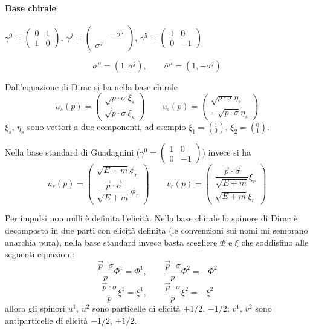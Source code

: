 \documentclass[12pt,a4paper]{article}
\begin{document}
	\paragraph{Base chirale}
	
	$\gamma^0 = \begin{pmatrix}
	0&1\\1&0
	\end{pmatrix}$, $\gamma^j = \begin{pmatrix}
	&-\sigma^j\\\sigma^j&
	\end{pmatrix}$, $\gamma^5 = \begin{pmatrix}
	1&0\\0&-1
	\end{pmatrix}$
	
	\[ \sigma^\mu = (1, \sigma^j),\qquad \bar{\sigma}^\mu = (1,-\sigma^j) \]
	
	Dall'equazione di Dirac si ha nella base chirale
	\[ u_s(p) = \begin{pmatrix}
	\sqrt{p\cdot \sigma}\xi_s\\ \sqrt{p\cdot \bar{\sigma}} \xi_s
	\end{pmatrix}
	\qquad
	v_s(p) = \begin{pmatrix}
	\sqrt{p\cdot \sigma}\eta_s\\ -\sqrt{p\cdot \bar{\sigma}} \eta_s
	\end{pmatrix} \]
	$\xi_s,\,\eta_s$ sono vettori a due componenti, ad esempio $\xi_1 = \left( ^{1}_{0} \right)$, $\xi_2 = \left( ^{0}_{1} \right)$.
	
	Nella base standard di Guadagnini ($\gamma^0 = \begin{pmatrix}
	1&0\\0&-1
	\end{pmatrix}$) invece si ha
	\[ u_r(p) = \begin{pmatrix}
	\sqrt{E+m}\phi_r\\ \dfrac{\vec{p}\cdot\vec{\sigma}}{\sqrt{E+m}} \phi_r
	\end{pmatrix}
	\qquad
	v_r(p) = \begin{pmatrix}
	\dfrac{\vec{p}\cdot\vec{\sigma}}{\sqrt{E+m}} \xi_r \\ \sqrt{E+m} \xi_r
	\end{pmatrix} \]
	
	Per impulsi non nulli è definita l'elicità. Nella base chirale lo spinore di Dirac è decomposto in due parti con elicità definita (le convenzioni sui nomi mi sembrano anarchia pura), nella base standard invece basta scegliere $\Phi$ e $\xi$ che soddisfino alle seguenti equazioni:
	\[ \dfrac{\vec{p}\cdot\sigma}{p} \Phi^1 = \Phi^1,\qquad \dfrac{\vec{p}\cdot\sigma}{p} \Phi^2 = -\Phi^2 \]
	\[ \dfrac{\vec{p}\cdot\sigma}{p} \xi^1 = \xi^1,\qquad \dfrac{\vec{p}\cdot\sigma}{p} \xi^2 = -\xi^2 \]
	allora gli spinori $u^1$, $u^2$ sono particelle di elicità $+1/2$, $-1/2$; $\bar{v}^1$, $\bar{v}^2$ sono antiparticelle di elicità $-1/2$, $+1/2$.
	
\end{document}
